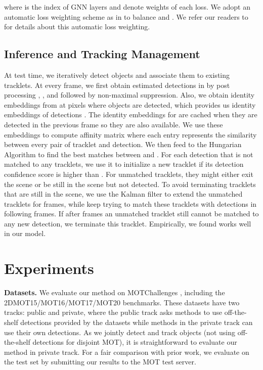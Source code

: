 \documentclass[letterpaper, 10 pt, conference]{ieeeconf}
\begin{document}
where  is the index of GNN layers and  denote weights of each loss. We adopt an automatic loss weighting scheme as in \cite{8578879} to balance  and . We refer our readers to \cite{8578879} for details about this automatic loss weighting.

\subsection{Inference and Tracking Management}

At test time, we iteratively detect objects and associate them to existing tracklets. At every frame, we first obtain estimated detections  in  by post processing , , and  followed by non-maximal suppression. Also, we obtain identity embeddings from  at pixels where objects are detected, which provides us identity embeddings of detections . The identity embeddings for  are cached when they are detected in the previous frame so they are also available. We use these embeddings to compute affinity matrix  where each entry represents the similarity between every pair of tracklet and detection. We then feed  to the Hungarian Algorithm \cite{WKuhn1955} to find the best matches between  and . For each detection that is not matched to any tracklets, we use it to initialize a new tracklet if its detection confidence score is higher than . For unmatched tracklets, they might either exit the scene or be still in the scene but not detected. To avoid terminating tracklets that are still in the scene, we use the Kalman filter \cite{Kalman1960} to extend the unmatched tracklets for  frames, while keep trying to match these tracklets with detections in following frames. If after  frames an unmatched tracklet still cannot be matched to any new detection, we terminate this tracklet. Empirically, we found  works well in our model. 
\section{Experiments}

\noindent\textbf{Datasets.} We evaluate our method on MOTChallenges \cite{Taixe2015, Milan2016, Dendorfer2019, Dendorfer2020}, including the 2DMOT15/MOT16/MOT17/MOT20 benchmarks. These datasets have two tracks: public and private, where the public track asks methods to use off-the-shelf detections provided by the datasets while methods in the private track can use their own detections. As we jointly detect and track objects (not using off-the-shelf detections for disjoint MOT), it is straightforward to evaluate our method in private track. For a fair comparison with prior work, we evaluate on the test set by submitting our results to the MOT test server.
\end{document}
